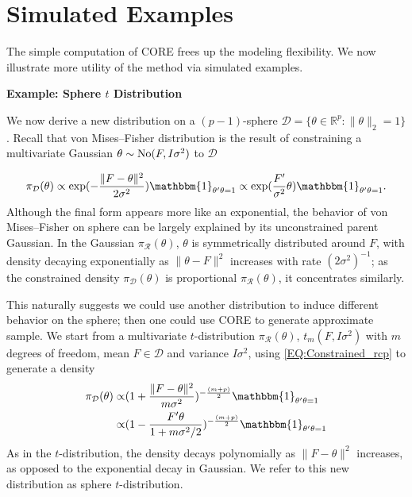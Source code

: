 \documentclass[10pt,fleqn]{article} \pdfoutput=1
\newcommand{\be}{\begin{equation}\begin{aligned}}
\newcommand{\ee}{\end{aligned}\end{equation}}
\newcommand{\bb}[1]{\mathbb{#1}} \newcommand{\mc}[1]{\mathcal{#1}}
\DeclareMathOperator{\1}{\mathbbm{1}} \DeclareMathOperator{\bigO}{\mc O}
\begin{document}
\section{Simulated Examples}

The simple computation of CORE frees up the modeling flexibility. We now illustrate more utility of the method via simulated examples.

\textbf{Example: Sphere $t$ Distribution}

We now derive a new distribution on a $(p-1)$-sphere $\mc
D=\{\theta\in
\bb R^p:\|\theta\|_2 =1\}$. Recall that von
Mises--Fisher distribution \citep{khatri1977mises} is the result of constraining a multivariate Gaussian $\theta \sim \operatorname{No}(F,I\sigma^2)$ to $\mc D$

$$
\pi_{\mc D}(\theta) \propto
\exp(-\frac{\|F-\theta\|^2}{2\sigma^2})
\mathbbm{1}_{\theta'\theta=1} \\
 \propto
\exp(\frac{F'}{\sigma^2}\theta)
\mathbbm{1}_{\theta'\theta=1}.
$$
 Although the final form
appears more
like an exponential, the behavior of von
Mises--Fisher
on sphere can be largely explained by its unconstrained parent Gaussian.
In the Gaussian $\pi_{\mc
R}(\theta)$, $\theta$ is symmetrically distributed around $F$, with density
decaying exponentially as $\| \theta-F\|^2$ increases with rate 
$({2\sigma^2})^{-1}$; as the constrained
density $\pi_{\mc D}(\theta)$ is proportional $\pi_{\mc R}(\theta)$, it concentrates
similarly. 

This naturally suggests we could use another distribution to induce different behavior on the sphere; then one could use CORE to generate approximate sample. We start from a
multivariate $t$-distribution $\pi_{\mc
R}(\theta)$, $t_m(F,I\sigma^2)$ with $m$ degrees of freedom,
mean $F\in \mc D$ and variance $I\sigma^2$, using \eqref{EQ:Constrained_rcp} to generate a density 
\be
\pi_{\mc
D}(\theta)
\propto &
(1+\frac{\|F-\theta\|^2}{m\sigma^2})^{-\frac{(m+p)}{2}}\mathbbm{1}_{\theta'\theta=1}\\
\propto &
(1-\frac{F'\theta}{1+m\sigma^2/2})^{-\frac{(m+p)}{2}}\mathbbm{1}_{\theta'\theta=1}
\ee
As in the $t$-distribution, the density decays polynomially as $\|F-\theta\|^2$ increases, as opposed to the exponential decay in Gaussian. We refer to this new distribution as sphere $t$-distribution.
\end{document}
